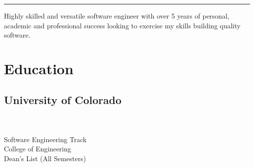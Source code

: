 \documentclass[letterpaper]{deedy-resume}
\begin{document}
\newcommand*{\xdash}[1][3em]{\rule[0.5ex]{#1}{0.55pt}}

\begin{minipage}[t]{0.30\textwidth}

    \vspace{0pt}

    \begin{minipage}{0.9\textwidth}
        \begin{center}

            \fontsize{24pt}{24pt}
            \selectfont{Josh}
            \selectfont{Rahm}

            


            \vspace{10pt}
            \xdash[6em]
            \vspace{10pt}
        \end{center}
    \end{minipage}\cvrule{0pt}{5em}

\raggedright
Highly skilled and versatile software engineer with over 5 years of personal,
academic and professional success looking to exercise my skills building quality
software.




\section{Education}

\subsection{University of Colorado}

\sectionspace

\vspace{\topsep}
\sepbullet {} \\
\sepbullet {} \\
\sepbullet Software Engineering Track \\
\sepbullet College of Engineering \\
\sepbullet Dean's List (All Semesters)




\end{minipage}
\end{document}
